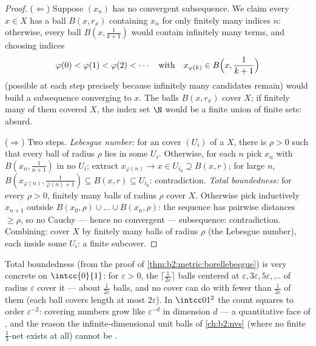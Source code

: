 \begin{proof}
($\Leftarrow$) Suppose $(x_n)$ has no convergent subsequence. We
claim every $x \in X$ has a ball $B(x, r_x)$ containing $x_n$
for only finitely many indices $n$: otherwise, every ball
$B(x, \frac1{k+1})$ would contain infinitely many terms, and
choosing indices
\[
\varphi(0) < \varphi(1) < \varphi(2) < \cdots
\quad\text{with}\quad
x_{\varphi(k)} \in B\Bigl(x, \frac{1}{k+1}\Bigr)
\]
(possible at each step precisely because infinitely many
candidates remain) would build a subsequence converging to $x$.
The balls $B(x, r_x)$ cover $X$; if finitely many of them
covered $X$, the index set $\N$ would be a finite union of
finite sets: absurd.

($\Rightarrow$) Two steps. \emph{Lebesgue number:} for an  cover
$(U_i)$ of a  $X$, there is $\rho > 0$ such that every ball
of radius $\rho$ lies in some $U_i$. Otherwise, for each $n$ pick
$x_n$ with $B(x_n, \frac{1}{n+1})$ in no $U_i$; extract
$x_{\varphi(n)} \to x \in U_{i_0} \supseteq B(x, r)$; for large $n$,
$B(x_{\varphi(n)}, \frac{1}{\varphi(n)+1}) \subseteq B(x, r)
\subseteq U_{i_0}$: contradiction. \emph{Total boundedness:} for
every $\rho > 0$, finitely many balls of radius $\rho$ cover $X$.
Otherwise pick inductively $x_{n+1}$ outside $B(x_0, \rho) \cup
\dots \cup B(x_n, \rho)$: the sequence has pairwise distances $\geq
\rho$, so no Cauchy --- hence no convergent --- subsequence:
contradiction. Combining: cover $X$ by finitely many balls of radius
$\rho$ (the Lebesgue number), each inside some $U_i$: a finite
subcover.
\end{proof}

\begin{example}\label{ex:b2:metric:epsnet}
Total boundedness (from the proof of
\cref{thm:b2:metric:borellebesgue}) is very concrete on
$\intcc{0}{1}$: for $\varepsilon > 0$, the $\lceil
\frac{1}{2\varepsilon}\rceil$ balls centered at $\varepsilon,
3\varepsilon, 5\varepsilon, \dots$ of radius $\varepsilon$
cover it --- about $\frac1{2\varepsilon}$ balls, and no cover
can do with fewer than $\frac{1}{2\varepsilon}$ of them (each
ball covers length at most $2\varepsilon$). In $\intcc01^2$
the count squares to order $\varepsilon^{-2}$: covering numbers
grow like $\varepsilon^{-d}$ in dimension $d$ --- a quantitative
face of , and the reason the infinite-dimensional
unit balls of \cref{ch:b2:nvs} (where no finite
$\frac13$-net exists at all) cannot be .
\end{example}

